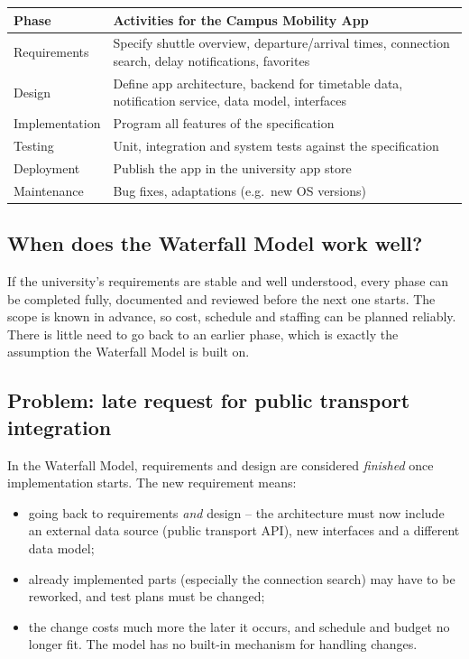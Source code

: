 \documentclass[11pt,a4paper]{article}
\begin{document}
\begin{tabularx}{\textwidth}{@{}l L@{}}
\toprule
\textbf{Phase} & \textbf{Activities for the Campus Mobility App} \\
\midrule
Requirements   & Specify shuttle overview, departure/arrival times, connection
                 search, delay notifications, favorites \\
Design         & Define app architecture, backend for timetable data,
                 notification service, data model, interfaces \\
Implementation & Program all features of the specification \\
Testing        & Unit, integration and system tests against the specification \\
Deployment     & Publish the app in the university app store \\
Maintenance    & Bug fixes, adaptations (e.g.\ new OS versions) \\
\bottomrule
\end{tabularx}

\subsection*{When does the Waterfall Model work well?}

If the university's requirements are stable and well understood, every
phase can be completed fully, documented and reviewed before the next one
starts. The scope is known in advance, so cost, schedule and staffing can
be planned reliably. There is little need to go back to an earlier phase,
which is exactly the assumption the Waterfall Model is built on.

\subsection*{Problem: late request for public transport integration}

In the Waterfall Model, requirements and design are considered
\emph{finished} once implementation starts. The new requirement means:
\begin{itemize}[itemsep=0.1em]
  \item going back to requirements \emph{and} design -- the architecture
        must now include an external data source (public transport API),
        new interfaces and a different data model;
  \item already implemented parts (especially the connection search) may
        have to be reworked, and test plans must be changed;
  \item the change costs much more the later it occurs, and schedule and
        budget no longer fit. The model has no built-in mechanism for
        handling changes.
\end{itemize}
\end{document}
